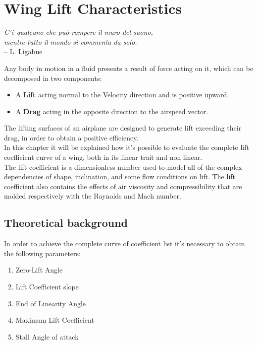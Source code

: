 \chapter{Wing Lift Characteristics}
\label{ch:worklift}

\begin{flushright}
	{\smaller
		\textit{C'è qualcuno che può rompere il muro del suono,\\ mentre tutto il mondo si commenta da solo.}\\
		-- L. Ligabue}
\end{flushright}


Any body in motion in a fluid presents a result of force acting on it, which can be decomposed in two components:
\begin{itemize}
\item A {\bfseries Lift} acting normal to the Velocity direction and is positive upward.
\item A {\bfseries Drag} acting in the opposite direction to the airspeed vector.
\end{itemize}
The lifting surfaces of an airplane are designed to generate lift exceeding their drag, in order to obtain a positive efficiency. \\ In this chapter it will be explained how it's possible to evaluate the complete lift coefficient curve of a wing, both in its linear trait and non linear.\\
The lift coefficient is a dimensionless number used to model all of the complex dependencies of shape, inclination, and some flow conditions on lift. The lift coefficient also contains the effects of air viscosity and compressibility that are molded respectively with the Raynolds and Mach number.%

\section{Theoretical background}

In order to achieve the complete curve of coefficient list it's necessary to obtain the following parameters:

\begin{enumerate}
\item Zero-Lift Angle
\item Lift Coefficient slope 
\item End of Linearity Angle
\item Maximum Lift Coefficient
\item Stall Angle of attack
\end{enumerate}

